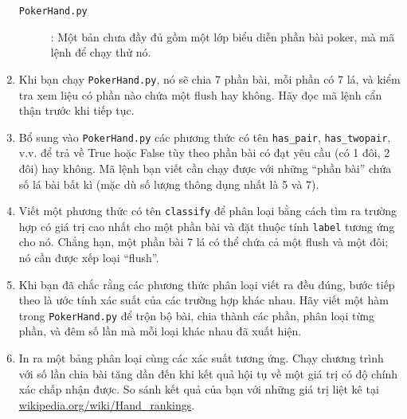 \documentclass[11pt]{book}
\begin{document}
\begin{ex}
\begin{enumerate}
\begin{description}
\item[{\tt PokerHand.py}]: Một bản chưa đầy đủ gồm một lớp
biểu diễn phần bài poker, mà mã lệnh để chạy thử nó.

\end{description}
%
\item Khi bạn chạy {\tt PokerHand.py}, nó sẽ chia 7 phần bài, mỗi phần
có 7 lá, và kiểm tra xem liệu có phần nào chứa một flush hay không. 
Hãy đọc mã lệnh cẩn thận trước khi tiếp tục.

\item Bổ sung vào {\tt PokerHand.py} các phương thức có tên \verb"has_pair",
\verb"has_twopair", v.v. để trả về True hoặc False tùy theo 
phần bài có đạt yêu cầu (có 1 đôi, 2 đôi) hay không. Mã lệnh bạn viết
cần chạy được với những ``phần bài'' chứa số lá bài bất kì
(mặc dù số lượng thông dụng nhất là 5 và 7).

\item Viết một phương thức có tên {\tt classify} để phân loại bằng cách tìm ra
trường hợp có giá trị cao nhất cho một phần bài và đặt
thuộc tính {\tt label} tương ứng cho nó. Chẳng hạn, một phần bài 7 lá
có thể chứa cả một flush và một đôi; nó cần được xếp loại ``flush''.

\item Khi bạn đã chắc rằng các phương thức phân loại viết ra đều đúng,
bước tiếp theo là ước tính xác suất của các trường hợp khác nhau.
Hãy viết một hàm trong {\tt PokerHand.py} để trộn bộ bài, chia thành
các phần, phân loại từng phần, và đêm số lần mà mỗi loại khác nhau
đã xuất hiện.

\item In ra một bảng phân loại cùng các xác suất tương ứng.
Chạy chương trình với số lần chia bài tăng dần đến khi kết quả hội tụ
về một giá trị có độ chính xác chấp nhận được. So sánh kết quả của bạn
với những giá trị liệt kê tại \url{wikipedia.org/wiki/Hand_rankings}.

\end{enumerate}
\end{ex}
\end{document}
